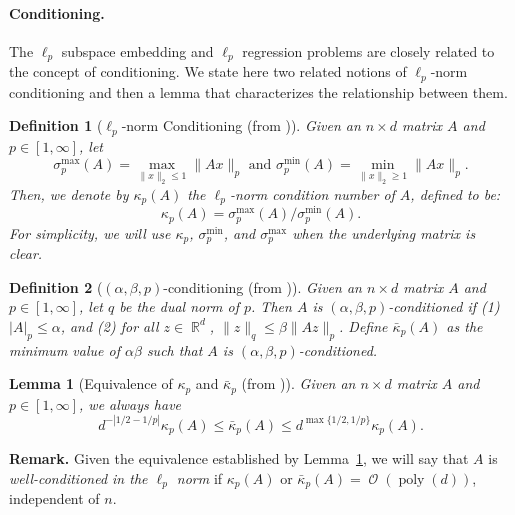 \documentclass[11pt]{article}
\newtheorem{definition}{Definition}
\newtheorem{lemma}{Lemma}
\DeclareMathOperator{\poly}{poly}
\DeclareMathOperator{\bigO}{\mathcal{O}}
\DeclareMathOperator{\R}{\mathbb{R}}
\begin{document}
\paragraph{Conditioning.}
The $\ell_p$ subspace embedding and $\ell_p$ regression problems are closely
related to the concept of conditioning.  
We state here two related notions of $\ell_p$-norm conditioning and then a lemma
that characterizes the relationship between them.

\begin{definition}[$\ell_p$-norm Conditioning (from \cite{CDMMMW13_SODA})]
  \label{def:lpnormcond}
  Given an $n \times d$ matrix $A$ and $p \in [1, \infty]$, let
  \begin{equation*}
    \sigma_p^{\max}(A) = \max_{\|x\|_2 \leq 1} \|A x\|_p \text{ and } \sigma_p^{\min}(A) = \min_{\|x\|_2 \geq 1} \|A x\|_p.
  \end{equation*}
  Then, we denote by $\kappa_p(A)$ the \emph{$\ell_p$-norm condition number of
    $A$}, defined to be:
  \begin{equation*}
    \kappa_p(A) = \sigma_p^{\max}(A) / \sigma_p^{\min}(A).
  \end{equation*}
  For simplicity, we will use $\kappa_p$, $\sigma_p^{\min}$, and 
  $\sigma_p^{\max}$ when the underlying matrix is clear.
\end{definition}

\begin{definition}[$(\alpha, \beta, p)$-conditioning (from \cite{DDHKM09_lp_SICOMP})]
\label{def:lpbasis}
  Given an $n \times d$ matrix $A$ and $p\in[1,\infty]$, let $q$ be the dual
  norm of $p$.
  Then $A$ is \emph{$(\alpha,\beta,p)$-conditioned} if (1) $|A|_p \leq \alpha$,
  and (2) for all $z \in \R^{d}$, $\|z\|_q \leq \beta \|A z\|_p$.
  Define $\bar{\kappa}_p(A)$ as the minimum value of $\alpha \beta$ such that
  $A$ is $(\alpha, \beta, p)$-conditioned. 
\end{definition}

\begin{lemma}[Equivalence of $\kappa_p$ and $\bar{\kappa}_p$ (from
  \cite{CDMMMW13_SODA})]
  \label{lemma:kappa_equiv}
  Given an $n \times d$ matrix $A$ and $p \in [1, \infty]$, we always have
  \begin{equation*}
    d^{-|1/2-1/p|} \kappa_p(A) \leq \bar{\kappa}_p(A) \leq d^{\max \{1/2, 1/p\}} \kappa_p(A).
  \end{equation*}
\end{lemma}

\noindent
\textbf{Remark.}
Given the equivalence established by Lemma~\ref{lemma:kappa_equiv}, we will say
that $A$ is \emph{well-conditioned in the $\ell_p$ norm} if $\kappa_p(A)$ or
$\bar{\kappa}_p(A) = \bigO(\poly(d))$, independent of $n$. 
\end{document}
